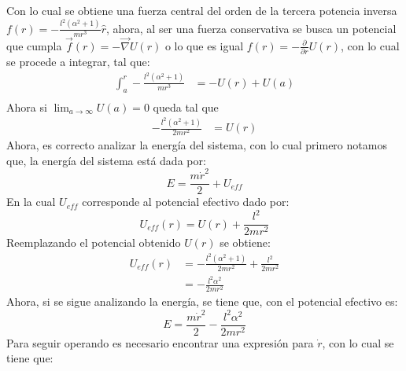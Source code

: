 \documentclass[../main.tex]{subfiles}
\begin{document}
Con lo cual se obtiene una fuerza central del orden de la tercera potencia inversa $f(r)=-\frac{l^2(\alpha^2+1)}{m r^3}\hat{r}$, ahora, al ser una fuerza conservativa se busca un potencial que cumpla $\vec{f}(r)=-\vec{\nabla} U(r)$ o lo que es igual ${f}(r)=-\frac{\partial }{\partial r}U(r)$, con lo cual se procede a integrar, tal que:
\begin{align*}
    \int_{a}^r -\frac{l^2(\alpha^2+1)}{m r^3} & =-U(r)+{U(a)} \\
\end{align*}
Ahora si $\lim_{a \to \infty}U(a)=0$ queda tal que 
\begin{align*}
    -\frac{l^2(\alpha^2+1)}{2m r^2} & = U(r)
\end{align*}
Ahora, es correcto analizar la energía del sistema, con lo cual primero notamos que,
la energía del sistema está dada por:
\begin{equation}
    E=\frac{m \dot{r}^2}{2}+U_{eff}
\end{equation}
En la cual $U_{eff}$ corresponde al potencial efectivo dado por:
\begin{equation*}
    U_{eff}(r)= U(r)+ \frac{l^2}{2mr^2} 
\end{equation*}
Reemplazando el potencial obtenido $U(r)$ se obtiene:
\begin{align*}
    U_{eff}(r) & = -\frac{l^2(\alpha^2+1)}{2m r^2} + \frac{l^2}{2mr^2} \\
    & = -\frac{l^2\alpha^2}{2m r^2}
\end{align*}
Ahora, si se sigue analizando la energía, se tiene que, con el potencial efectivo es:
\begin{equation*}
    E= \frac{m \dot{r}^2}{2}-\frac{l^2\alpha^2}{2m r^2}
\end{equation*}
Para seguir operando es necesario encontrar una expresión para $\dot{r}$, con lo cual se tiene que:
\end{document}
